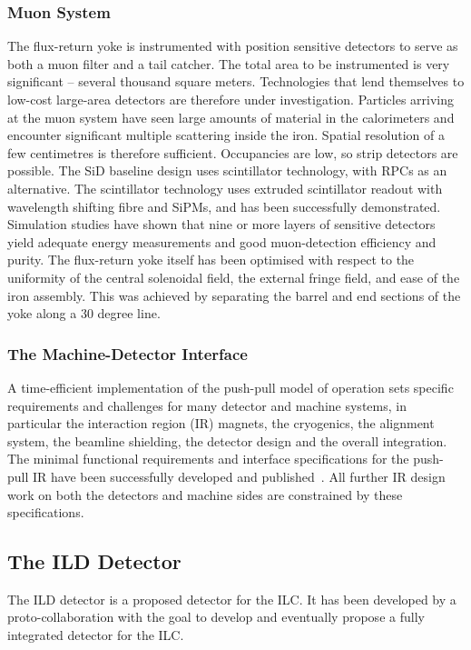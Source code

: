 \subsubsection{Muon System}
The flux-return yoke is instrumented with position sensitive detectors to
serve as both a muon filter and a tail catcher. The total area to be
instrumented is very significant -- several thousand square meters. Technologies
that lend themselves to low-cost large-area detectors are therefore under
investigation. Particles arriving at the muon system have seen large amounts of
material in the calorimeters and encounter significant multiple scattering
inside the iron. Spatial resolution of a few centimetres is therefore
sufficient. Occupancies are low, so strip detectors are possible. The SiD 
baseline design uses scintillator technology, with RPCs as an alternative. 
The scintillator technology uses extruded scintillator readout with wavelength 
shifting fibre and SiPMs, and has been successfully demonstrated. 
Simulation studies have shown that nine or more layers of sensitive detectors 
yield adequate energy measurements and good muon-detection efficiency and purity.
The flux-return yoke itself has been optimised with respect to the
uniformity of the central solenoidal field, the external fringe field,
and ease of the iron assembly. 
This was achieved by separating the  barrel and end sections of the
yoke along a 30 degree line.

\subsubsection{The Machine-Detector Interface}
A time-efficient implementation of the push-pull model of
operation sets specific requirements and challenges for many detector and
machine systems, in particular the interaction region (IR) magnets, the
cryogenics, the alignment system, the beamline shielding, the detector design
and the overall integration. The minimal functional requirements and interface
specifications for the push-pull IR have been successfully developed and
published~\cite{Platform_Agreement,IR_Layout}.  All further IR design
work on both the detectors and machine sides are constrained by these 
specifications. 

\subsection{The ILD Detector}
The ILD detector is a proposed detector for the ILC. It has been developed by a proto-collaboration with the goal to develop and eventually propose a fully integrated detector for the ILC. 

